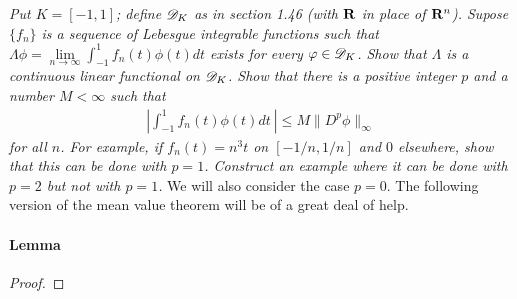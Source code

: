 \textit{
Put $K=[-1,1]$; define ${\mathscr D}_{K}$ as in section 1.46 
(with ${\mathbf R}$ in place of ${\mathbf R}^{n}$). 
Supose $\{f_{n}\}$ is a sequence of Lebesgue integrable functions such that 
%
  $\Lambda\phi 
    = 
  \underset{n \to \infty}{\lim} \int_{\minus 1}^1 f_{n}(t)\phi(t)dt$
%
exists for every $\varphi\in{\mathscr D}_{K}$. 
Show that $\Lambda$ is a continuous linear functional on ${\mathscr D}_{K}$. 
Show that there is a positive integer $p$ and a number $M<\infty$ such that 
  \begin{align}
    \left\lvert 
      \int_{\minus 1}^1 f_n (t)\phi (t) dt\
    \right\rvert
    \leq 
    M \|D^{p} \phi \|_\infty
  \nonumber
  \end{align}
for all $n$.
For example, if $f_{n}(t)=n^{3}t$ on $[\minus 1/n, 1/n]$ and $0$ elsewhere, 
show that this can be done with $p=1$. 
Construct an example where it can be done with $p=2$ but not with $p=1$.}
%
%
\renewcommand{\labelenumi}{(\roman{enumi})}%
%
\newline\newline\noindent
We will also consider the case $p=0$. The following version of %
the mean value theorem will be of a great deal of help.
%
\paragraph{Lemma}\label{2.3 Lemma}

%
\begin{proof}




\end{proof}
\renewcommand{\labelenumi}{$(\textit{\alph{enumi}})$}%